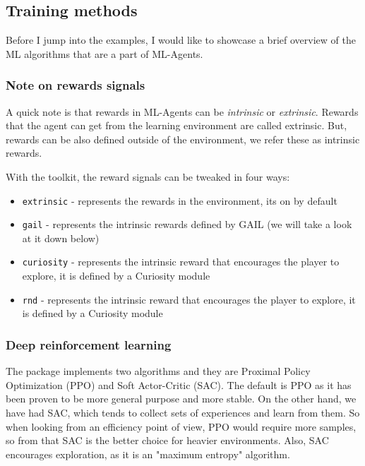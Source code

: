 \documentclass[a4paper, 12pt]{book}
\begin{document}
\subsection{Training methods}

Before I jump into the examples, I would like to showcase a brief overview of the ML algorithms that are a part of ML-Agents.

\subsubsection{Note on rewards signals}

A quick note is that rewards in ML-Agents can be \emph{intrinsic} or \emph{extrinsic}. Rewards that the agent can get from the learning environment are called extrinsic. But, rewards can be also defined outside of the environment, we refer these as intrinsic rewards.

With the toolkit, the reward signals can be tweaked in four ways:
\begin{itemize}
    \item \texttt{extrinsic} - represents the rewards in the environment, its on by default
    \item \texttt{gail} - represents the intrinsic rewards defined by GAIL (we will take a look at it down below)
    \item \texttt{curiosity} - represents the intrinsic reward that encourages the player to explore, it is defined by a Curiosity module
    \item \texttt{rnd} - represents the intrinsic reward that encourages the player to explore, it is defined by a Curiosity module
\end{itemize}

\subsubsection{Deep reinforcement learning}

The package implements two algorithms and they are Proximal Policy Optimization (PPO) and Soft Actor-Critic (SAC). The default is PPO as it has been proven to be more general purpose and more stable. On the other hand, we have had SAC, which tends to collect sets of experiences and learn from them. So when looking from an efficiency point of view, PPO would require more samples, so from that SAC is the better choice for heavier environments. Also, SAC encourages exploration, as it is an "maximum entropy" algorithm.
\end{document}
